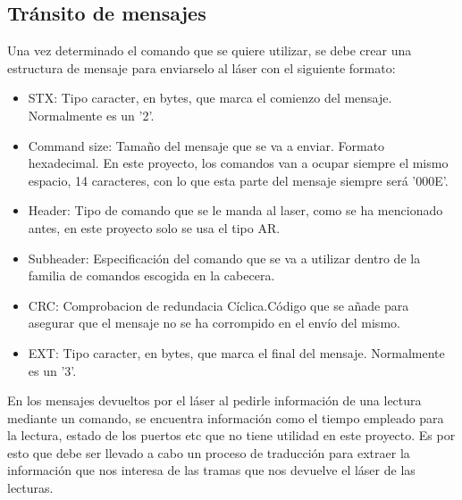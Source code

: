 \subsection{Tránsito de mensajes}
Una vez determinado el comando que se quiere utilizar, se debe crear una estructura de mensaje para enviarselo al láser con el siguiente formato:
\begin{itemize}
	\item STX: Tipo caracter, en bytes, que marca el comienzo del mensaje. Normalmente es un '2'.
 	\item Command size: Tamaño del mensaje que se va a enviar. Formato hexadecimal. En este proyecto, los comandos van a ocupar siempre el mismo espacio, 14 caracteres, con lo que esta parte del mensaje siempre será '000E'.
 	\item Header: Tipo de comando que se le manda al laser, como se ha mencionado antes, en este proyecto solo se usa el tipo AR.
 	\item Subheader: Especificación del comando que se va a utilizar dentro de la familia de comandos escogida en la cabecera.
 	\item CRC:  Comprobacion de redundacia Cíclica.Código que se añade para asegurar que el mensaje no se ha corrompido en el envío del mismo. 
 	\item EXT: Tipo caracter, en bytes, que marca el final del mensaje. Normalmente es un '3'.
 \end{itemize}

En los mensajes devueltos por el láser al pedirle información de una lectura mediante un comando, se encuentra información como el tiempo empleado para la lectura, estado de los puertos etc que no tiene utilidad en este proyecto. Es por esto que debe ser llevado a cabo un proceso de traducción para extraer la información que nos interesa de las tramas que nos devuelve el láser de las lecturas.





